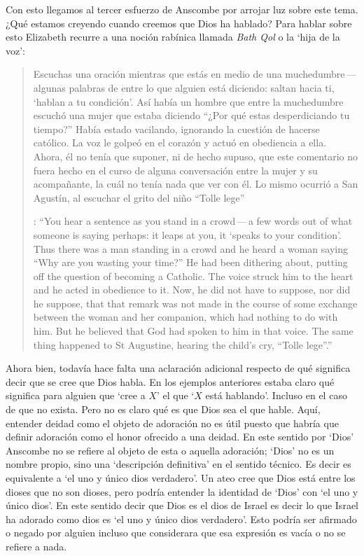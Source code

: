 Con esto llegamos al tercer esfuerzo de Anscombe por arrojar luz sobre este tema. ¿Qué estamos creyendo cuando creemos que Dios ha hablado? Para hablar sobre esto Elizabeth recurre a una noción rabínica llamada \emph{Bath Qol} o la `hija de la voz': \blockquote[{\cite[118-119]{anscombe1981erp:faith}}: \enquote{You hear a sentence as you stand in a crowd\,---\,a few words out of what someone is saying perhaps: it leaps at you, it `speaks to your condition'. Thus there was a man standing in a crowd and he heard a woman saying ``Why are you wasting your time?'' He had been dithering about, putting off the question of becoming a Catholic. The voice struck him to the heart and he acted in obedience to it. Now, he did not have to suppose, nor did he suppose, that that remark was not made in the course of some exchange between the woman and her companion, which had nothing to do with him. But he believed that God had spoken to him in that voice. The same thing happened to St Augustine, hearing the child's cry, ``Tolle lege''.}]{Escuchas una oración mientras que estás en medio de una muchedumbre\,---\,algunas palabras de entre lo que alguien está diciendo: saltan hacia ti, `hablan a tu condición'. Así había un hombre que entre la muchedumbre escuchó una mujer que estaba diciendo ``¿Por qué estas desperdiciando tu tiempo?'' Había estado vacilando, ignorando la cuestión de hacerse católico. La voz le golpeó en el corazón y actuó en obediencia a ella. Ahora, él no tenía que suponer, ni de hecho supuso, que este comentario no fuera hecho en el curso de alguna conversación entre la mujer y su acompañante, la cuál no tenía nada que ver con él. Lo mismo ocurrió a San Agustín, al escuchar el grito del niño ``Tolle lege''}.

Ahora bien, todavía hace falta una aclaración adicional respecto de qué significa decir que se cree que Dios habla. En los ejemplos anteriores estaba claro qué significa para alguien que \enquote*{cree a $X$} el que \enquote*{$X$ está hablando}. Incluso en el caso de que no exista. Pero no es claro qué es que Dios sea el que hable. Aquí, entender deidad como el objeto de adoración no es útil puesto que habría que definir adoración como el honor ofrecido a una deidad. En este sentido por `Dios' Anscombe no se refiere al objeto de esta o aquella adoración; `Dios' no es un nombre propio, sino una `descripción definitiva' en el sentido técnico. Es decir es equivalente a `el uno y único dios verdadero'. Un ateo cree que Dios está entre los dioses que no son dioses, pero podría entender la identidad de `Dios' con `el uno y único dios'. En este sentido decir que Dios es el dios de Israel es decir lo que Israel ha adorado como dios es `el uno y único dios verdadero'. Esto podría ser afirmado o negado por alguien incluso que considerara que esa expresión es vacía o no se refiere a nada.


